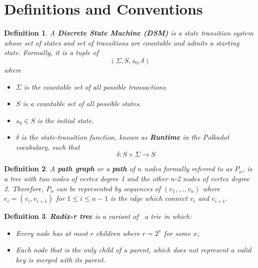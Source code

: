 \documentclass{book}
\newcommand{\tmstrong}[1]{\textbf{#1}}
\newcommand{\tmtextbf}[1]{{\bfseries{#1}}}
\newtheorem{definition}{Definition}
\providecommand{\tmstrong}[1]{\tmtextbf{#1}}
\providecommand{\tmtextbf}[1]{\tmtextbf{#1}}
\newtheorem{definition}{Definition}
\begin{document}
\section{Definitions and Conventions}\label{sect-defn-conv}

\begin{definition}
  \label{defn-state-machine}A {\tmstrong{Discrete State Machine (DSM)}} is a
  state transition system whose set of states and set of transitions are
  countable and admits a starting state. Formally, it is a tuple of
  \[  (\Sigma, S, s_0, \delta) \]
  where
  \begin{itemize}
    \item $\Sigma$ is the countable set of all possible transactions.
    
    \item $S$ is a countable set of all possible states.
    
    \item $s_0 \in S$ is the initial state.
    
    \item $\delta$ is the state-transition function, known as
    \label{defn-runtime}{\tmstrong{Runtime}} in the Polkadot vocabulary, such
    that
    \[ \delta : S \times \Sigma \rightarrow S \]
  \end{itemize}
\end{definition}

\begin{definition}
  \label{defn-path-graph}A {\tmstrong{path graph}} or a {\tmstrong{path}} of
  $n$ nodes formally referred to as \label{autolab1}{\tmstrong{$P_n$}}, is a
  tree with two nodes of vertex degree 1 and the other n-2 nodes of vertex
  degree 2. Therefore, $P_n$ can be represented by sequences of $(v_1, \ldots,
  v_n)$ where $e_i = (v_i, v_{i + 1})$ for $1 \leqslant i \leqslant n - 1$ is
  the edge which connect $v_i$ and $v_{i + 1}$.
\end{definition}

\begin{definition}
  \label{defn-radix-tree}{\tmstrong{Radix-r tree}} is a variant of \ a trie in
  which:
  \begin{itemize}
    \item Every node has at most $r$ children where $r = 2^x$ for some $x$;
    
    \item Each node that is the only child of a parent, which does not
    represent a valid key is merged with its parent.
  \end{itemize}
\end{definition}
\end{document}
